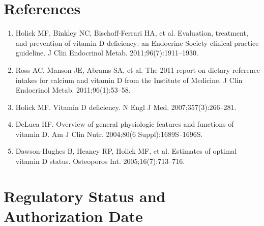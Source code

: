 \section*{References}
\begin{enumerate}
  \item Holick MF, Binkley NC, Bischoff-Ferrari HA, et al. Evaluation, treatment, and prevention of vitamin D deficiency: an Endocrine Society clinical practice guideline. J Clin Endocrinol Metab. 2011;96(7):1911--1930.
  \item Ross AC, Manson JE, Abrams SA, et al. The 2011 report on dietary reference intakes for calcium and vitamin D from the Institute of Medicine. J Clin Endocrinol Metab. 2011;96(1):53--58.
  \item Holick MF. Vitamin D deficiency. N Engl J Med. 2007;357(3):266--281.
  \item DeLuca HF. Overview of general physiologic features and functions of vitamin D. Am J Clin Nutr. 2004;80(6 Suppl):1689S--1696S.
  \item Dawson-Hughes B, Heaney RP, Holick MF, et al. Estimates of optimal vitamin D status. Osteoporos Int. 2005;16(7):713--716.
\end{enumerate}
\clearpage
\section*{Regulatory Status and Authorization Date}

\clearpage
